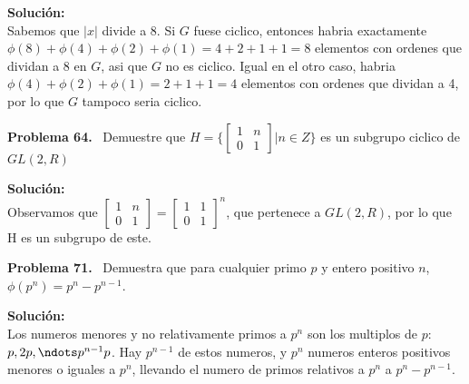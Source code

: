 \documentclass{article}
\newcounter{problem}
\newcounter{solution}
\newcommand\Problem[1]{%
  \stepcounter{problem}%
  \textbf{Problema #1.}~%
  \setcounter{solution}{0}%
}
\newcommand\TheSolution{%
  \textbf{Solución:}\\%
}
\begin{document}
\TheSolution{} Sabemos que $|x|$ divide a $8$. Si $G$ fuese ciclico, entonces
habria exactamente $\phi(8) + \phi(4) + \phi(2) + \phi(1) = 4 + 2 + 1 + 1 = 8$
elementos con ordenes que dividan a $8$ en $G$, asi que $G$ no es ciclico.
Igual en el otro caso, habria $\phi(4) + \phi(2) + \phi(1) = 2 + 1 + 1 = 4$
elementos con ordenes que dividan a 4, por lo que $G$ tampoco seria ciclico.

\Problem{64} Demuestre que $H = \Bigg\{\begin{bmatrix}
  1 & n \\
  0 & 1
\end{bmatrix} | n \in Z\Bigg\}$ es un subgrupo ciclico de $GL(2, R)$

\TheSolution{} Observamos que $\begin{bmatrix}
  1 & n \\
  0 & 1
\end{bmatrix} = \begin{bmatrix}
  1 & 1 \\
  0 & 1
\end{bmatrix}^{n}$, que pertenece a $GL(2, R)$, por lo que H es un subgrupo de
este.

\Problem{71} Demuestra que para cualquier primo $p$ y entero positivo $n$,
$\phi(p^n) = p^n - p^{n - 1}$.

\TheSolution{} Los numeros menores y no relativamente primos a $p^n$ son los
multiplos de $p$: $p, 2p, \ndots p^{n-1}p$. Hay $p^{n-1}$ de estos numeros, y
$p^n$ numeros enteros positivos menores o iguales a $p^n$, llevando el numero
de primos relativos a $p^n$ a $p^n - p^{n-1}$.
\end{document}
